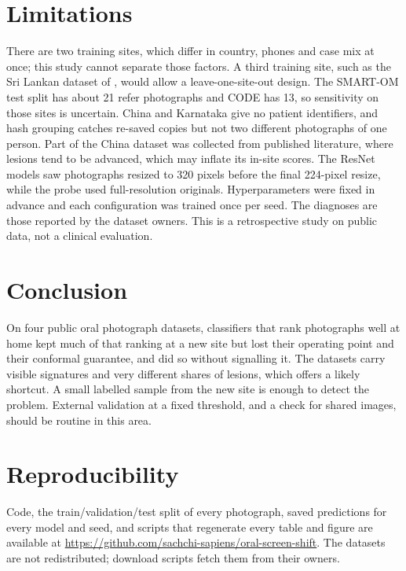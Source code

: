 \documentclass[11pt]{article}
\begin{document}
\section{Limitations}

There are two training sites, which differ in country, phones and case mix at once; this study cannot separate those factors. A third training site, such as the Sri Lankan dataset of \citet{piyarathne2024dataset}, would allow a leave-one-site-out design. The SMART-OM test split has about 21 refer photographs and CODE has 13, so sensitivity on those sites is uncertain. China and Karnataka give no patient identifiers, and hash grouping catches re-saved copies but not two different photographs of one person. Part of the China dataset was collected from published literature, where lesions tend to be advanced, which may inflate its in-site scores. The ResNet models saw photographs resized to 320 pixels before the final 224-pixel resize, while the probe used full-resolution originals. Hyperparameters were fixed in advance and each configuration was trained once per seed. The diagnoses are those reported by the dataset owners. This is a retrospective study on public data, not a clinical evaluation.

\section{Conclusion}

On four public oral photograph datasets, classifiers that rank photographs well at home kept much of that ranking at a new site but lost their operating point and their conformal guarantee, and did so without signalling it. The datasets carry visible signatures and very different shares of lesions, which offers a likely shortcut. A small labelled sample from the new site is enough to detect the problem. External validation at a fixed threshold, and a check for shared images, should be routine in this area.

\section*{Reproducibility}

Code, the train/validation/test split of every photograph, saved predictions for every model and seed, and scripts that regenerate every table and figure are available at \url{https://github.com/sachchi-sapiens/oral-screen-shift}. The datasets are not redistributed; download scripts fetch them from their owners.



\end{document}
